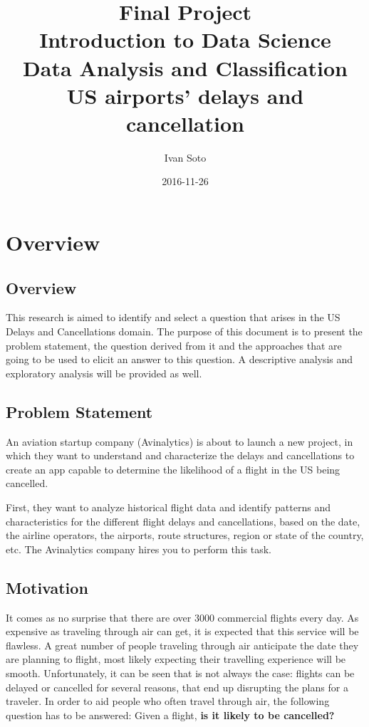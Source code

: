 \documentclass{article}
\title{ {Final Project}\\
        Introduction to Data Science\\
        Data Analysis and Classification\\
        US airports’ delays and cancellation}
\date{2016-11-26}
\author{Ivan Soto}
\begin{document}
    \maketitle
	\newpage
	\tableofcontents
    \newpage
    \section{Overview}
    \subsection{Overview}
    This research is aimed to identify and select a question that arises in the US Delays
    and Cancellations domain. The purpose of this document is to present the
    problem statement, the question derived from it and the approaches that are
    going to be used to elicit an answer to this question. A descriptive analysis and exploratory analysis will be provided as well.
    \subsection{Problem Statement}
    An aviation startup company (Avinalytics) is about to launch a new project, in which they want to understand and characterize the delays and cancellations to create an app capable to determine the likelihood of a flight in the US being cancelled.

First, they want to analyze historical flight data and identify patterns and characteristics for the different flight delays and cancellations, based on the date, the airline operators, the airports, route structures, region or state of the country, etc. The Avinalytics company hires you to perform this task.

    \subsection{Motivation}
    It comes as no surprise that there are over 3000 commercial flights every day.
    As expensive as traveling through air can get, it is expected that this
    service will be flawless. A great number of people traveling through air anticipate
    the date they are planning to flight, most likely expecting their travelling
    experience will be smooth. Unfortunately, it can be seen that is not always
    the case: flights can be delayed or cancelled for several reasons, that end
    up disrupting the plans for a traveler.\newline
    \indent In order to aid people who often travel through air, the following question
    has to be answered: Given a flight, \textbf{is it likely to be cancelled?}
\end{document}
